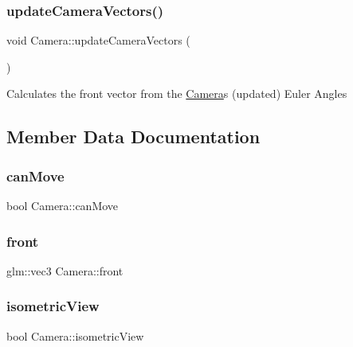 \mbox{\label{classCamera_ad424b8b92e580508caf21337b69b93fa}} 
\subsubsection{\texorpdfstring{update\+Camera\+Vectors()}{updateCameraVectors()}}
{\footnotesize\ttfamily void Camera\+::update\+Camera\+Vectors (\begin{DoxyParamCaption}{ }\end{DoxyParamCaption})\hspace{0.3cm}{\ttfamily [private]}}

Calculates the front vector from the \hyperlink{classCamera}{Camera}\textquotesingle{}s (updated) Euler Angles 

\subsection{Member Data Documentation}
\mbox{\label{classCamera_a2ca23fedd1347287c43a09640fc1b62f}} 
\subsubsection{\texorpdfstring{can\+Move}{canMove}}
{\footnotesize\ttfamily bool Camera\+::can\+Move}

\mbox{\label{classCamera_a8847cf29c9c124906ad5d97ecb5c55d1}} 
\subsubsection{\texorpdfstring{front}{front}}
{\footnotesize\ttfamily glm\+::vec3 Camera\+::front}

\mbox{\label{classCamera_a64a6a08664697359c21d55a9e1239c0a}} 
\subsubsection{\texorpdfstring{isometric\+View}{isometricView}}
{\footnotesize\ttfamily bool Camera\+::isometric\+View}

